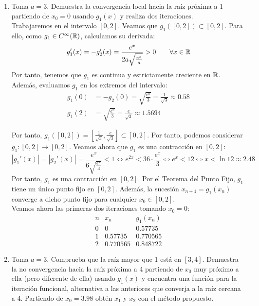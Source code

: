 \begin{ejercicio}
\begin{enumerate}
        
        \item Toma $a = 3$. Demuestra la convergencia local hacia la raíz próxima a 1 partiendo de $x_0 = 0$ usando $g_1(x)$ y realiza dos iteraciones.\\
        
        Trabajaremos en el intervalo $[0,2]$. Veamos que $g_1\left([0,2]\right) \subset [0,2]$. Para ello, como $g_1\in C^\infty(\mathbb{R})$, calculamos su derivada:
        \begin{align*}
            g_1'(x) = -g_2'(x) = \dfrac{e^x}{2a\sqrt{\frac{e^x}{a}}}>0\qquad \forall x\in \mathbb{R}
        \end{align*}
        Por tanto, tenemos que $g_1$ es continua y estrictamente creciente en $\mathbb{R}$. Además, evaluamos $g_1$ en los extremos del intervalo:
        \begin{align*}
            g_1(0) &= -g_2(0) = \sqrt{\frac{e^0}{3}} = \frac{1}{\sqrt{3}}\approx 0.58\\
            g_1(2) &= \sqrt{\frac{e^2}{3}} = \frac{e}{\sqrt{3}}\approx 1.5694
        \end{align*}

        Por tanto, $g_1\left([0,2]\right)=\left[\frac{1}{\sqrt{3}}, \frac{e}{\sqrt{3}}\right]\subset [0,2]$. Por tanto, podemos considerar $g_1: [0,2]\to [0,2]$.
        Veamos ahora que $g_1$ es una contracción en $[0,2]$:
        \begin{equation*}
            |g_1'(x)|=|g_2'(x)|=\dfrac{e^x}{6\sqrt{\frac{e^x}{3}}}<1\Longleftrightarrow
            e^{2x}<36\cdot \dfrac{e^x}{3}
            \iff e^x<12\iff x<\ln 12\approx 2.48
        \end{equation*}
        Por tanto, $g_1$ es una contracción en $[0,2]$. Por el Teorema del Punto Fijo, $g_1$ tiene un único punto fijo en $[0,2]$. Además, la sucesión $x_{n+1}=g_1(x_n)$ converge a dicho punto fijo para cualquier $x_0\in [0,2]$.\\
        Veamos ahora las primeras dos iteraciones tomando $x_0=0$:
        \begin{equation*}
            \begin{array}{c|c|c}
                n & x_n & g_1(x_n)\\ \hline
                0 & 0 & 0.57735\\
                1 & 0.57735 & 0.770565\\
                2 & 0.770565 & 0.848722
            \end{array}
        \end{equation*}
        \item Toma $a = 3$. Comprueba que la raíz mayor que 1 está en $[3, 4]$. Demuestra la no convergencia hacia la raíz próxima a 4 partiendo de $x_0$ muy próximo a ella (pero diferente de ella) usando $g_1(x)$ y encuentra una función para la iteración funcional, alternativa a las anteriores que converja a la raíz cercana a 4. Partiendo de $x_0 = 3.98$ obtén $x_1$ y $x_2$ con el método propuesto.\\
        

\end{enumerate}
\end{ejercicio}
